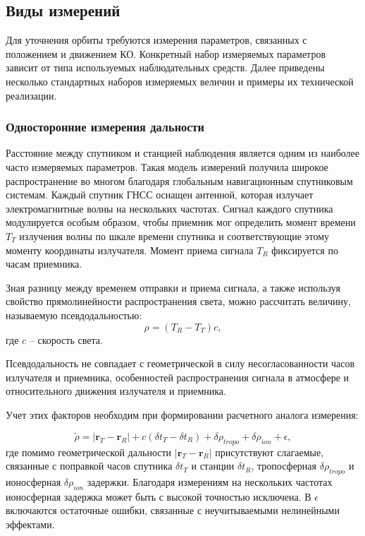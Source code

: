 \subsection{Виды измерений}

Для уточнения орбиты требуются измерения параметров, связанных с положением и движением КО.
Конкретный набор измеряемых параметров зависит от типа используемых наблюдательных средств.
Далее приведены несколько стандартных наборов измеряемых величин и примеры их технической реализации.

\subsubsection{Односторонние измерения дальности}
Расстояние между спутником и станцией наблюдения является одним из наиболее часто измеряемых параметров.
Такая модель измерений получила широкое распространение во многом благодаря глобальным навигационным спутниковым системам.
Каждый спутник ГНСС оснащен антенной, которая излучает электромагнитные волны на нескольких частотах.
Сигнал каждого спутника модулируется особым образом, чтобы приемник мог определить момент времени $T_{T}$ излучения волны по шкале времени спутника
и соответствующие этому моменту координаты излучателя. Момент приема сигнала $T_{R}$ фиксируется по часам приемника.

Зная разницу между временем отправки и приема сигнала, а также используя свойство прямолинейности распространения света, можно 
рассчитать величину, называемую псевдодальностью:
\begin{equation*}
    \rho = (T_{R} - T_{T}) c,
\end{equation*}
где $c$ -- скорость света.

Псевдодальность не совпадает с геометрической в силу несогласованности часов излучателя и приемника, 
особенностей распространения сигнала в атмосфере и относительного движения излучателя и приемника.

Учет этих факторов необходим при формировании расчетного аналога измерения:

\begin{equation*}
    \tilde{\rho} = |\mathbf{r}_{T} - \mathbf{r}_{R}| 
                    + c \left( \delta t_{T} - \delta t_{R} \right)
                    + \delta \rho_{tropo} + \delta \rho_{ion} + \epsilon,
\end{equation*}
где помимо геометрической дальности $|\mathbf{r}_{T} - \mathbf{r}_{R}|$ присутствуют слагаемые,
связанные с поправкой часов спутника $\delta t_{T}$ и станции $\delta t_{R}$, тропосферная $\delta \rho_{tropo}$ и ионосферная $\delta \rho_{ion}$ задержки.
Благодаря измерениям на нескольких частотах ионосферная задержка может быть с высокой точностью исключена.
В $\epsilon$ включаются остаточные ошибки, связанные с неучитываемыми нелинейными эффектами.

